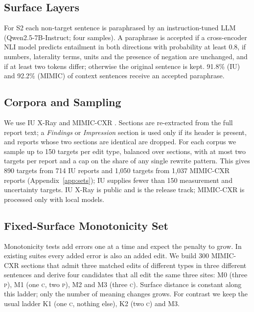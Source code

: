 \documentclass[11pt]{article}
\newcommand{\Pc}{\textsc{p}\xspace}
\newcommand{\Cc}{\textsc{c}\xspace}
\begin{document}
\subsection{Surface Layers}

For S2 each non-target sentence is paraphrased by an instruction-tuned LLM (Qwen2.5-7B-Instruct; four samples). A paraphrase is accepted if a cross-encoder NLI model predicts entailment in both directions with probability at least 0.8, if numbers, laterality terms, units and the presence of negation are unchanged, and if at least two tokens differ; otherwise the original sentence is kept. 91.8\% (IU) and 92.2\% (MIMIC) of context sentences receive an accepted paraphrase.

\subsection{Corpora and Sampling}

We use IU X-Ray \citep{demner-fushman-etal-2016-iu} and MIMIC-CXR \citep{johnson-etal-2019-mimiccxr}. Sections are re-extracted from the full report text; a \emph{Findings} or \emph{Impression} section is used only if its header is present, and reports whose two sections are identical are dropped. For each corpus we sample up to 150 targets per edit type, balanced over sections, with at most two targets per report and a cap on the share of any single rewrite pattern. This gives 890 targets from 714 IU reports and 1,050 targets from 1,037 MIMIC-CXR reports (Appendix~\ref{app:sets}); IU supplies fewer than 150 measurement and uncertainty targets. IU X-Ray is public and is the release track; MIMIC-CXR is processed only with local models.

\subsection{Fixed-Surface Monotonicity Set}
\label{sec:monodesign}

Monotonicity tests add errors one at a time and expect the penalty to grow. In existing suites every added error is also an added edit. We build 300 MIMIC-CXR sections that admit three matched edits of different types in three different sentences and derive four candidates that all edit the same three sites: M0 (three \Pc), M1 (one \Cc, two \Pc), M2 and M3 (three \Cc). Surface distance is constant along this ladder; only the number of meaning changes grows. For contrast we keep the usual ladder K1 (one \Cc, nothing else), K2 (two \Cc) and M3.
\end{document}
